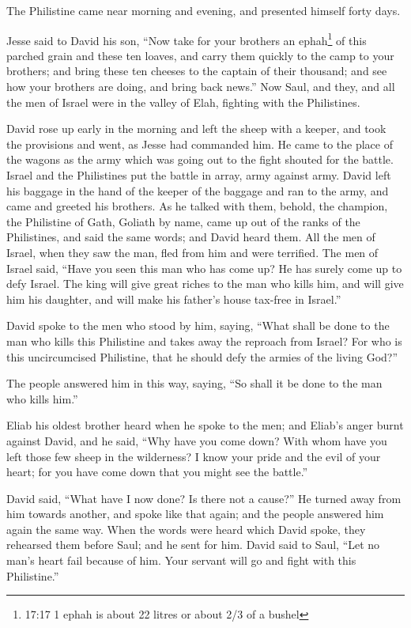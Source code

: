  The Philistine came near morning and evening, and
presented himself forty days.

 Jesse said to David his son, ``Now take for your brothers
an ephah\footnote{17:17 1 ephah is about 22 litres or about 2/3 of a
  bushel} of this parched grain and these ten loaves, and carry them
quickly to the camp to your brothers;  and bring these ten
cheeses to the captain of their thousand; and see how your brothers are
doing, and bring back news.''  Now Saul, and they, and all
the men of Israel were in the valley of Elah, fighting with the
Philistines.

 David rose up early in the morning and left the sheep with
a keeper, and took the provisions and went, as Jesse had commanded him.
He came to the place of the wagons as the army which was going out to
the fight shouted for the battle.  Israel and the
Philistines put the battle in array, army against army. 
David left his baggage in the hand of the keeper of the baggage and ran
to the army, and came and greeted his brothers.  As he
talked with them, behold, the champion, the Philistine of Gath, Goliath
by name, came up out of the ranks of the Philistines, and said the same
words; and David heard them.  All the men of Israel, when
they saw the man, fled from him and were terrified.  The
men of Israel said, ``Have you seen this man who has come up? He has
surely come up to defy Israel. The king will give great riches to the
man who kills him, and will give him his daughter, and will make his
father's house tax-free in Israel.''

 David spoke to the men who stood by him, saying, ``What
shall be done to the man who kills this Philistine and takes away the
reproach from Israel? For who is this uncircumcised Philistine, that he
should defy the armies of the living God?''

 The people answered him in this way, saying, ``So shall it
be done to the man who kills him.''

 Eliab his oldest brother heard when he spoke to the men;
and Eliab's anger burnt against David, and he said, ``Why have you come
down? With whom have you left those few sheep in the wilderness? I know
your pride and the evil of your heart; for you have come down that you
might see the battle.''

 David said, ``What have I now done? Is there not a
cause?''  He turned away from him towards another, and
spoke like that again; and the people answered him again the same way.
 When the words were heard which David spoke, they
rehearsed them before Saul; and he sent for him.  David
said to Saul, ``Let no man's heart fail because of him. Your servant
will go and fight with this Philistine.''

